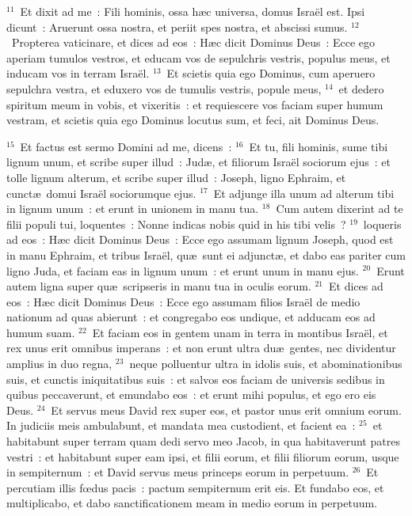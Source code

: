 ${}^{11}$~Et dixit ad me~: Fili hominis, ossa h\ae c universa, domus Isra\"el est. Ipsi dicunt~: Aruerunt ossa nostra, et periit spes nostra, et abscissi sumus.
${}^{12}$~Propterea vaticinare, et dices ad eos~: H\ae c dicit Dominus Deus~: Ecce ego aperiam tumulos vestros, et educam vos de sepulchris vestris, populus meus, et inducam vos in terram Isra\"el.
${}^{13}$~Et scietis quia ego Dominus, cum aperuero sepulchra vestra, et eduxero vos de tumulis vestris, popule meus,
${}^{14}$~et dedero spiritum meum in vobis, et vixeritis~: et requiescere vos faciam super humum vestram, et scietis quia ego Dominus locutus sum, et feci, ait Dominus Deus.


${}^{15}$~Et factus est sermo Domini ad me, dicens~:
${}^{16}$~Et tu, fili hominis, sume tibi lignum unum, et scribe super illud~: Jud\ae , et filiorum Isra\"el sociorum ejus~: et tolle lignum alterum, et scribe super illud~: Joseph, ligno Ephraim, et cunct\ae\ domui Isra\"el sociorumque ejus.
${}^{17}$~Et adjunge illa unum ad alterum tibi in lignum unum~: et erunt in unionem in manu tua.
${}^{18}$~Cum autem dixerint ad te filii populi tui, loquentes~: Nonne indicas nobis quid in his tibi velis~?
${}^{19}$~loqueris ad eos~: H\ae c dicit Dominus Deus~: Ecce ego assumam lignum Joseph, quod est in manu Ephraim, et tribus Isra\"el, qu\ae\ sunt ei adjunct\ae , et dabo eas pariter cum ligno Juda, et faciam eas in lignum unum~: et erunt unum in manu ejus.
${}^{20}$~Erunt autem ligna super qu\ae\ scripseris in manu tua in oculis eorum.
${}^{21}$~Et dices ad eos~: H\ae c dicit Dominus Deus~: Ecce ego assumam filios Isra\"el de medio nationum ad quas abierunt~: et congregabo eos undique, et adducam eos ad humum suam.
${}^{22}$~Et faciam eos in gentem unam in terra in montibus Isra\"el, et rex unus erit omnibus imperans~: et non erunt ultra du\ae\ gentes, nec dividentur amplius in duo regna,
${}^{23}$~neque polluentur ultra in idolis suis, et abominationibus suis, et cunctis iniquitatibus suis~: et salvos eos faciam de universis sedibus in quibus peccaverunt, et emundabo eos~: et erunt mihi populus, et ego ero eis Deus.
${}^{24}$~Et servus meus David rex super eos, et pastor unus erit omnium eorum. In judiciis meis ambulabunt, et mandata mea custodient, et facient ea~:
${}^{25}$~et habitabunt super terram quam dedi servo meo Jacob, in qua habitaverunt patres vestri~: et habitabunt super eam ipsi, et filii eorum, et filii filiorum eorum, usque in sempiternum~: et David servus meus princeps eorum in perpetuum.
${}^{26}$~Et percutiam illis fœdus pacis~: pactum sempiternum erit eis. Et fundabo eos, et multiplicabo, et dabo sanctificationem meam in medio eorum in perpetuum.
